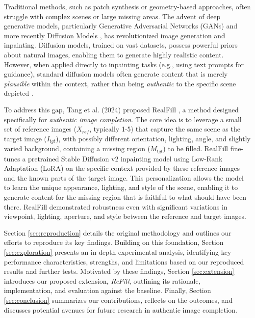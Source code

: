 \documentclass{article}
\begin{document}
Traditional methods, such as patch synthesis or geometry-based approaches, often struggle with complex scenes or large missing areas. The advent of deep generative models, particularly Generative Adversarial Networks (GANs) \cite{goodfellow2014generative} and more recently Diffusion Models \cite{ho2020denoising, song2021scorebased, rombach2022high}, has revolutionized image generation and inpainting. Diffusion models, trained on vast datasets, possess powerful priors about natural images, enabling them to generate highly realistic content. However, when applied directly to inpainting tasks (e.g., using text prompts for guidance), standard diffusion models often generate content that is merely \emph{plausible} within the context, rather than being \emph{authentic} to the specific scene depicted \cite{tang2024realfill}.

To address this gap, Tang et al. (2024) proposed RealFill \cite{tang2024realfill}, a method designed specifically for \emph{authentic image completion}. The core idea is to leverage a small set of reference images ($X_{ref}$, typically 1-5) that capture the same scene as the target image ($I_{tgt}$), with possibly different orientation, lighting, angle, and slightly varied background, containing a missing region ($M_{tgt}$) to be filled. RealFill fine-tunes a pretrained Stable Diffusion v2 inpainting model \cite{rombach2022high} using Low-Rank Adaptation (LoRA) \cite{hu2022lora} on the specific context provided by these reference images and the known parts of the target image. This personalization allows the model to learn the unique appearance, lighting, and style of the scene, enabling it to generate content for the missing region that is faithful to what should have been there. RealFill demonstrated robustness even with significant variations in viewpoint, lighting, aperture, and style between the reference and target images.

Section \ref{sec:reproduction} details the original methodology and outlines our efforts to reproduce its key findings. Building on this foundation, Section \ref{sec:exploration} presents an in-depth experimental analysis, identifying key performance characteristics, strengths, and limitations based on our reproduced results and further tests. Motivated by these findings, Section \ref{sec:extension} introduces our proposed extension, \emph{ReFill}, outlining its rationale, implementation, and evaluation against the baseline. Finally, Section \ref{sec:conclusion} summarizes our contributions, reflects on the outcomes, and discusses potential avenues for future research in authentic image completion.
\end{document}
